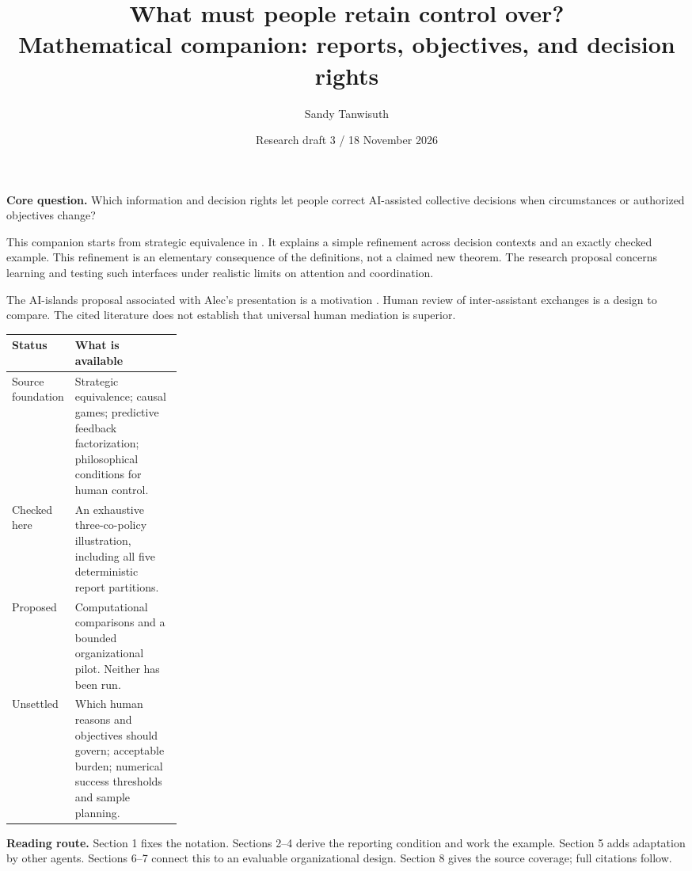 \documentclass[11pt,letterpaper]{article}
\title{What must people retain control over?\\\large Mathematical companion: reports, objectives, and decision rights}
\author{Sandy Tanwisuth}
\date{Research draft 3 / 18 November 2026}
\begin{document}
\maketitle
\textbf{Core question.} Which information and decision rights let people correct AI-assisted collective decisions when circumstances or authorized objectives change?

This companion starts from strategic equivalence in \citet{lauffer2023knowledge}. It explains a simple refinement across decision contexts and an exactly checked example. This refinement is an elementary consequence of the definitions, not a claimed new theorem. The research proposal concerns learning and testing such interfaces under realistic limits on attention and coordination.

The AI-islands proposal associated with Alec's presentation is a motivation \citep{xor2026balance}. Human review of inter-assistant exchanges is a design to compare. The cited literature does not establish that universal human mediation is superior.

\begin{tabularx}{\linewidth}{L{0.25\linewidth}Y}\toprule
Status & What is available \\\midrule
Source foundation & Strategic equivalence; causal games; predictive feedback factorization; philosophical conditions for human control. \\
Checked here & An exhaustive three-co-policy illustration, including all five deterministic report partitions. \\
Proposed & Computational comparisons and a bounded organizational pilot. Neither has been run. \\
Unsettled & Which human reasons and objectives should govern; acceptable burden; numerical success thresholds and sample planning. \\\bottomrule
\end{tabularx}

\textbf{Reading route.} Section 1 fixes the notation. Sections 2--4 derive the reporting condition and work the example. Section 5 adds adaptation by other agents. Sections 6--7 connect this to an evaluable organizational design. Section 8 gives the source coverage; full citations follow.
\end{document}
